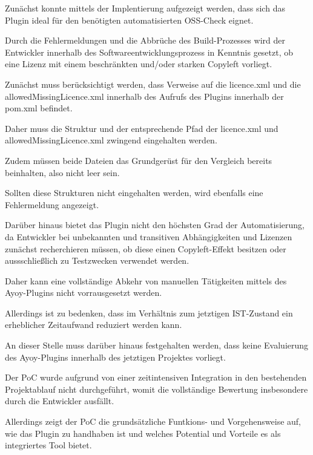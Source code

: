 Zunächst konnte mittels der Implentierung aufgezeigt werden, dass sich das Plugin ideal für den benötigten automatisierten OSS-Check eignet. 

Durch die Fehlermeldungen und die Abbrüche des Build-Prozesses wird der Entwickler innerhalb des Softwareentwicklungsprozess in Kenntnis gesetzt, ob eine Lizenz mit einem beschränkten und/oder starken Copyleft vorliegt. 

Zunächst muss berücksichtigt werden, dass Verweise auf die licence.xml und die allowedMissingLicence.xml innerhalb des Aufrufs des Plugins innerhalb der pom.xml befindet. 

Daher muss die Struktur und der entsprechende Pfad der licence.xml und allowedMissingLicence.xml zwingend eingehalten werden.

Zudem müssen beide Dateien das Grundgerüst für den Vergleich bereits beinhalten, also nicht leer sein. 

Sollten diese Strukturen nicht eingehalten werden, wird ebenfalls eine Fehlermeldung angezeigt. 

Darüber hinaus bietet das Plugin nicht den höchsten Grad der Automatisierung, da Entwickler bei unbekannten und transitiven Abhängigkeiten und Lizenzen zunächst recherchieren müssen, ob diese einen Copyleft-Effekt besitzen oder aussschließlich zu Testzwecken verwendet werden.  

Daher kann eine vollständige Abkehr von manuellen Tätigkeiten mittels des Ayoy-Plugins nicht vorrausgesetzt werden. 

Allerdings ist zu bedenken, dass im Verhältnis zum jetztigen IST-Zustand ein erheblicher Zeitaufwand reduziert werden kann. 

An dieser Stelle muss darüber hinaus festgehalten werden, dass keine Evaluierung des Ayoy-Plugins innerhalb des jetztigen Projektes vorliegt. 

Der PoC wurde aufgrund von einer zeitintensiven Integration in den bestehenden Projektablauf nicht durchgeführt, womit die vollständige Bewertung insbesondere durch die Entwickler ausfällt. 

Allerdings zeigt der PoC die grundsätzliche Funtkions- und Vorgehensweise auf, wie das Plugin zu handhaben ist und welches Potential und Vorteile es als integriertes Tool bietet.
 